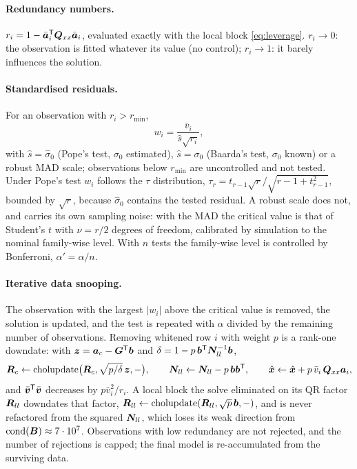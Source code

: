 \paragraph{Redundancy numbers.} $r_i=1-\bar{\bm{a}}_i^{\mathsf T}\bm{Q}_{xx}\bar{\bm{a}}_i$, evaluated exactly with
the local block \eqref{eq:leverage}. $r_i\to0$: the observation is fitted whatever its value (no
control); $r_i\to1$: it barely influences the solution.

\paragraph{Standardised residuals.} For an observation with $r_i>r_{\min}$,
\begin{equation}
w_i=\frac{\bar v_i}{\hat s\sqrt{r_i}},
\end{equation}
with $\hat s=\hat\sigma_0$ (Pope's test, $\sigma_0$ estimated), $\hat s=\sigma_0$ (Baarda's test,
$\sigma_0$ known) or a robust MAD scale; observations below $r_{\min}$ are uncontrolled and not
tested. Under Pope's test $w_i$ follows the $\tau$ distribution,
$\tau_r=t_{r-1}\sqrt r/\sqrt{r-1+t_{r-1}^2}$, bounded by $\sqrt r$, because $\hat\sigma_0$ contains the
tested residual. A robust scale does not, and carries its own sampling noise: with the MAD the
critical value is that of Student's $t$ with $\nu=r/2$ degrees of freedom, calibrated by simulation
to the nominal family-wise level. With $n$ tests the family-wise
level is controlled by Bonferroni, $\alpha'=\alpha/n$.

\paragraph{Iterative data snooping.} The observation with the largest $|w_i|$ above the critical
value is removed, the solution is updated, and the test is repeated with $\alpha$ divided by the
remaining number of observations. Removing whitened row $i$ with weight $p$ is a rank-one downdate:
with $\bm{z}=\bm{a}_c-\bm{G}^{\mathsf T}\bm{b}$ and $\delta=1-p\,\bm{b}^{\mathsf T}\bm{N}_{ll}^{-1}\bm{b}$,
\begin{equation}
\bm{R}_c\leftarrow\operatorname{cholupdate}\bigl(\bm{R}_c,\sqrt{p/\delta}\,\bm{z},-\bigr),\qquad
\bm{N}_{ll}\leftarrow\bm{N}_{ll}-p\,\bm{b}\bm{b}^{\mathsf T},\qquad
\hat{\bm{x}}\leftarrow\hat{\bm{x}}+p\,\bar v_i\,\bm{Q}_{xx}\bm{a}_i ,
\end{equation}
and $\bar{\bm{v}}^{\mathsf T}\bar{\bm{v}}$ decreases by $p\bar v_i^2/r_i$. A local block the solve eliminated on its
QR factor $\bm{R}_{ll}$ downdates that factor,
$\bm{R}_{ll}\leftarrow\operatorname{cholupdate}(\bm{R}_{ll},\sqrt p\,\bm{b},-)$, and is never
refactored from the squared $\bm{N}_{ll}$, which loses its weak direction from
$\operatorname{cond}(\bm{B})\approx7\cdot10^{7}$. Observations with low redundancy are not
rejected, and the number of rejections is capped; the final model is re-accumulated from the
surviving data.

